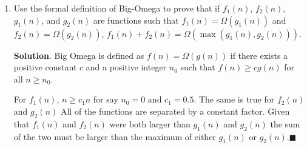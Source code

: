 \documentclass[12pt, letterpaper]{article}
\begin{document}
\begin{enumerate}
    \item Use the formal definition of Big-Omega to prove that if $f_1(n)$, $f_2(n)$, $g_1(n)$, and $g_2(n)$ are functions such that $f_1(n) = \Omega(g_1(n))$ and $f_2(n) = \Omega(g_2(n))$, $f_1(n) + f_2(n) = \Omega(\max(g_1(n), g_2(n)))$.

    \textbf{Solution}. Big Omega is defined as $f(n) = \Omega(g(n))$ if there exists a positive constant $c$ and a positive integer $n_0$ such that $f(n) \geq cg(n)$ for all $n \geq n_0$.

    For $f_1(n)$, $n \geq c_1n$ for say $n_0=0$ and $c_1=0.5$. The same is true for $f_2(n)$ and $g_2(n)$  All of the functions are separated by a constant factor.  Given that $f_1(n)$ and $f_2(n)$ were both larger than $g_1(n)$ and $g_2(n)$ the sum of the two must be larger than the maximum of either $g_1(n)$ or $g_2(n)$.$\blacksquare$
\end{enumerate}
\end{document}
